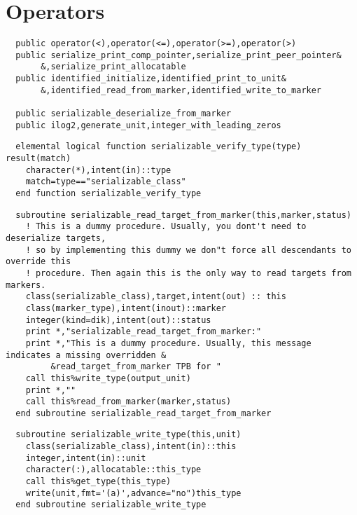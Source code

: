 \section{Operators}
\begin{Verbatim}
  public operator(<),operator(<=),operator(>=),operator(>)
  public serialize_print_comp_pointer,serialize_print_peer_pointer&
       &,serialize_print_allocatable
  public identified_initialize,identified_print_to_unit&
       &,identified_read_from_marker,identified_write_to_marker

  public serializable_deserialize_from_marker
  public ilog2,generate_unit,integer_with_leading_zeros
\end{Verbatim}
\Methods
{}

\begin{Verbatim}
  elemental logical function serializable_verify_type(type) result(match)
    character(*),intent(in)::type
    match=type=="serializable_class"
  end function serializable_verify_type
\end{Verbatim}

\begin{Verbatim}
  subroutine serializable_read_target_from_marker(this,marker,status)
    ! This is a dummy procedure. Usually, you dont't need to deserialize targets,
    ! so by implementing this dummy we don"t force all descendants to override this
    ! procedure. Then again this is the only way to read targets from markers.
    class(serializable_class),target,intent(out) :: this
    class(marker_type),intent(inout)::marker
    integer(kind=dik),intent(out)::status
    print *,"serializable_read_target_from_marker:"
    print *,"This is a dummy procedure. Usually, this message indicates a missing overridden &
         &read_target_from_marker TPB for "
    call this%write_type(output_unit)
    print *,""
    call this%read_from_marker(marker,status)
  end subroutine serializable_read_target_from_marker
\end{Verbatim}

\begin{Verbatim}
  subroutine serializable_write_type(this,unit)
    class(serializable_class),intent(in)::this
    integer,intent(in)::unit
    character(:),allocatable::this_type
    call this%get_type(this_type)
    write(unit,fmt='(a)',advance="no")this_type
  end subroutine serializable_write_type
\end{Verbatim}

